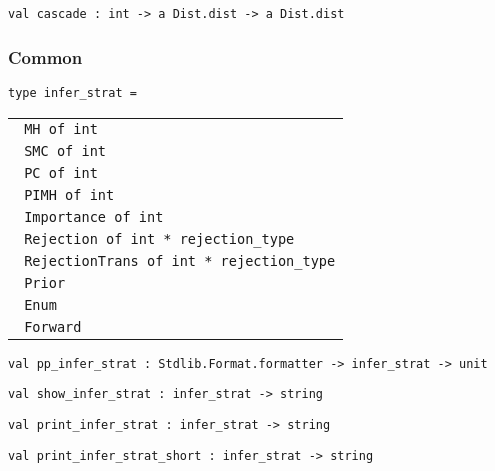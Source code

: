 \protect\hyperlink{val-cascadeux27}{}\texttt{val\ cascade\textquotesingle{}\ :\ int\ -\textgreater{}\ \textquotesingle{}a\ Dist.dist\ -\textgreater{}\ \textquotesingle{}a\ Dist.dist}

\hypertarget{com}{\subsubsection{\texorpdfstring{\protect\hyperlink{com}{}Common}{Common}}\label{com}}

\protect\hyperlink{type-inferux5fstrat}{}\texttt{type\ infer\_strat}\texttt{\ =\ }

\begin{longtable}[c]{@{}l@{}}
\toprule
\protect\hyperlink{type-inferux5fstrat.MH}{}\texttt{\textbar{}\ }\texttt{MH\ of\ int}\tabularnewline
\protect\hyperlink{type-inferux5fstrat.SMC}{}\texttt{\textbar{}\ }\texttt{SMC\ of\ int}\tabularnewline
\protect\hyperlink{type-inferux5fstrat.PC}{}\texttt{\textbar{}\ }\texttt{PC\ of\ int}\tabularnewline
\protect\hyperlink{type-inferux5fstrat.PIMH}{}\texttt{\textbar{}\ }\texttt{PIMH\ of\ int}\tabularnewline
\protect\hyperlink{type-inferux5fstrat.Importance}{}\texttt{\textbar{}\ }\texttt{Importance\ of\ int}\tabularnewline
\protect\hyperlink{type-inferux5fstrat.Rejection}{}\texttt{\textbar{}\ }\texttt{Rejection\ of\ int\ *\ rejection\_type}\tabularnewline
\protect\hyperlink{type-inferux5fstrat.RejectionTrans}{}\texttt{\textbar{}\ }\texttt{RejectionTrans\ of\ int\ *\ rejection\_type}\tabularnewline
\protect\hyperlink{type-inferux5fstrat.Prior}{}\texttt{\textbar{}\ }\texttt{Prior}\tabularnewline
\protect\hyperlink{type-inferux5fstrat.Enum}{}\texttt{\textbar{}\ }\texttt{Enum}\tabularnewline
\protect\hyperlink{type-inferux5fstrat.Forward}{}\texttt{\textbar{}\ }\texttt{Forward}\tabularnewline
\bottomrule
\end{longtable}

\protect\hyperlink{val-ppux5finferux5fstrat}{}\texttt{val\ pp\_infer\_strat\ :\ Stdlib.Format.formatter\ -\textgreater{}\ infer\_strat\ -\textgreater{}\ unit}

\protect\hyperlink{val-showux5finferux5fstrat}{}\texttt{val\ show\_infer\_strat\ :\ infer\_strat\ -\textgreater{}\ string}

\protect\hyperlink{val-printux5finferux5fstrat}{}\texttt{val\ print\_infer\_strat\ :\ infer\_strat\ -\textgreater{}\ string}

\protect\hyperlink{val-printux5finferux5fstratux5fshort}{}\texttt{val\ print\_infer\_strat\_short\ :\ infer\_strat\ -\textgreater{}\ string}

